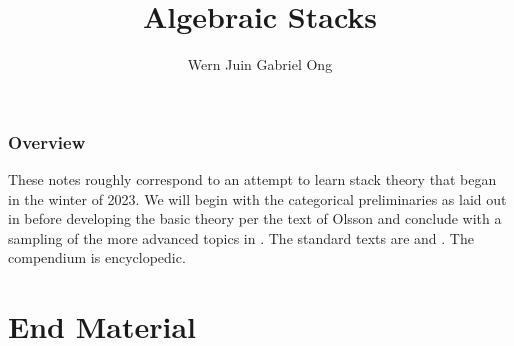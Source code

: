 \documentclass{amsart}
\theoremstyle{definition}
\numberwithin{equation}{section}
\begin{document}
\large
\title[Algebraic Stacks]{Algebraic Stacks}
\author{Wern Juin Gabriel Ong}
\address{Bowdoin College, Brunswick, Maine 04011}
\maketitle
\section*{Overview}
These notes roughly correspond to an attempt to learn stack theory that began in the winter of 2023. We will begin with the categorical preliminaries as laid out in \cite{Vistoli} before developing the basic theory per the text of Olsson \cite{Olsson} and conclude with a sampling of the more advanced topics in \cite[Part 7]{stacks-project}. The standard texts are \cite{LaumonMoret-Bailly} and \cite{Olsson}. The compendium \cite{stacks-project} is encyclopedic. 
\tableofcontents
\newpage













\part*{End Material}
\printbibliography
\end{document}
